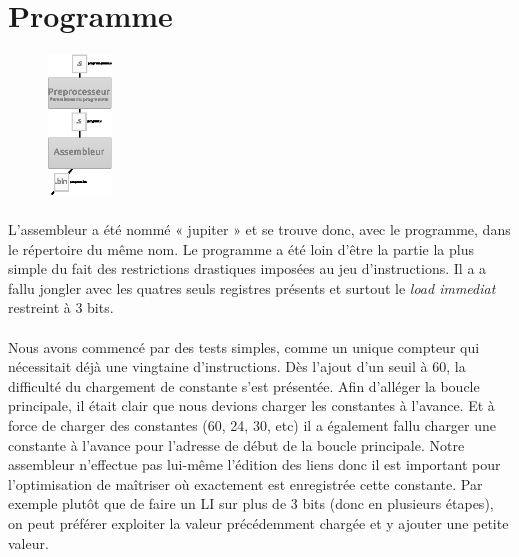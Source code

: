 \documentclass{article}
\begin{document}
\section{Programme}

\begin{figure}
\begin{center}
\includegraphics[width=0.15\textwidth]{zoom_prog.eps}
\end{center}
\end{figure}

\paragraph{}L'assembleur a été nommé « jupiter » et se trouve donc, avec le programme, dans le répertoire du même nom. Le programme a été loin d'être la partie la plus simple du fait des restrictions drastiques imposées au jeu d'instructions. Il a a fallu jongler avec les quatres seuls registres présents et surtout le \emph{load immediat} restreint à 3 bits.

\paragraph{}Nous avons commencé par des tests simples, comme un unique compteur qui nécessitait déjà une vingtaine d'instructions. Dès l'ajout d'un seuil à 60, la difficulté du chargement de constante s'est présentée. Afin d'alléger la boucle principale, il était clair que nous devions charger les constantes à l'avance. Et à force de charger des constantes (60, 24, 30, etc) il a également fallu charger une constante à l'avance pour l'adresse de début de la boucle principale. Notre assembleur n'effectue pas lui-même l'édition des liens donc il est important pour l'optimisation de maîtriser où exactement est enregistrée cette constante. Par exemple plutôt que de faire un LI sur plus de 3 bits (donc en plusieurs étapes), on peut préférer exploiter la valeur précédemment chargée et y ajouter une petite valeur.
\end{document}
